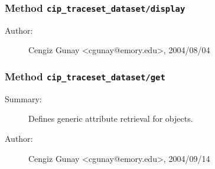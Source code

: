 \subsubsection[Method \texttt{display}]{Method \texttt{cip\_traceset\_dataset/display}}%
%
\label{ref_cip_traceset_dataset__display}%
\hypertarget{ref_cip_traceset_dataset__display}{}%
\begin{description}
%
%
%
%
%
%
%
\item[Author:]%
Cengiz Gunay <cgunay@emory.edu>, 2004/08/04%
\end{description}
\methodline%
\subsubsection[Method \texttt{get}]{Method \texttt{cip\_traceset\_dataset/get}}%
%
\label{ref_cip_traceset_dataset__get}%
\hypertarget{ref_cip_traceset_dataset__get}{}%
\begin{description}
\item[Summary:]Defines generic attribute retrieval for objects.
%
%
%
%
%
%
%
\item[Author:]%
Cengiz Gunay <cgunay@emory.edu>, 2004/09/14%
\end{description}
\methodline%
